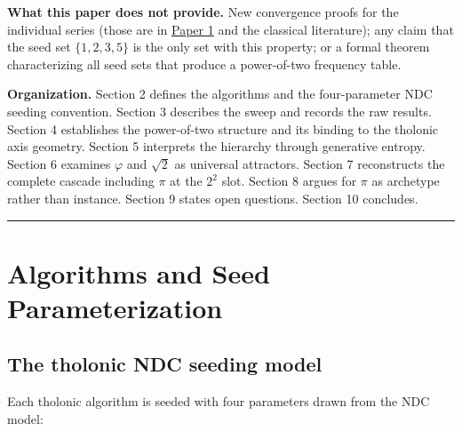 \documentclass[12pt]{article}
\begin{document}
\textbf{What this paper does not provide.} New convergence proofs for
the individual series (those are in
\href{https://github.com/baardev/truevalue/blob/main/docnav/Research/papers/1_recursive-tholonic-five-constants/1_recursive-tholonic-five-constants.pdf}{Paper
1} and the classical literature); any claim that the seed set
\(\{1, 2, 3, 5\}\) is the only set with this property; or a formal
theorem characterizing all seed sets that produce a power-of-two
frequency table.

\textbf{Organization.} Section 2 defines the algorithms and the
four-parameter NDC seeding convention. Section 3 describes the sweep and
records the raw results. Section 4 establishes the power-of-two
structure and its binding to the tholonic axis geometry. Section 5
interprets the hierarchy through generative entropy. Section 6 examines
\(\varphi\) and \(\sqrt{2}\) as universal attractors. Section 7
reconstructs the complete cascade including \(\pi\) at the \(2^2\) slot.
Section 8 argues for \(\pi\) as archetype rather than instance. Section
9 states open questions. Section 10 concludes.

\begin{center}\rule{0.5\linewidth}{0.5pt}\end{center}

\section{Algorithms and Seed Parameterization}\label{algorithms-and-seed-parameterization}

\subsection{The tholonic NDC seeding model}\label{the-tholonic-ndc-seeding-model}

Each tholonic algorithm is seeded with four parameters drawn from the
NDC model:
\end{document}
